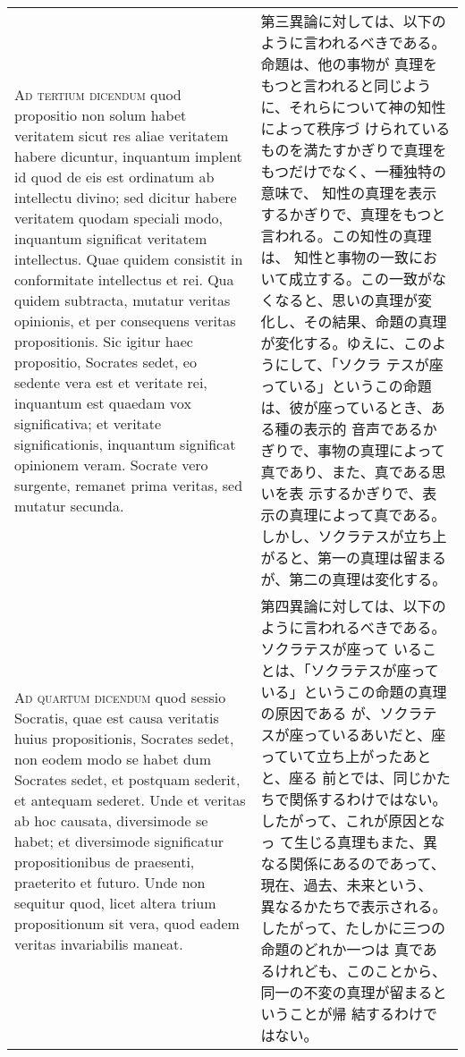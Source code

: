\documentclass[10pt]{jsarticle} %
\begin{document}
\begin{longtable}{p{21em}p{21em}}
\\


{\scshape Ad tertium dicendum} quod propositio non solum habet
veritatem sicut res aliae veritatem habere dicuntur, inquantum implent
id quod de eis est ordinatum ab intellectu divino; sed dicitur habere
veritatem quodam speciali modo, inquantum significat veritatem
intellectus. Quae quidem consistit in conformitate intellectus et
rei. Qua quidem subtracta, mutatur veritas opinionis, et per
consequens veritas propositionis. Sic igitur haec propositio, Socrates
sedet, eo sedente vera est et veritate rei, inquantum est quaedam vox
significativa; et veritate significationis, inquantum significat
opinionem veram. Socrate vero surgente, remanet prima veritas, sed
mutatur secunda.

&

第三異論に対しては、以下のように言われるべきである。命題は、他の事物が
真理をもつと言われると同じように、それらについて神の知性によって秩序づ
けられているものを満たすかぎりで真理をもつだけでなく、一種独特の意味で、
知性の真理を表示するかぎりで、真理をもつと言われる。この知性の真理は、
知性と事物の一致において成立する。この一致がなくなると、思いの真理が変
化し、その結果、命題の真理が変化する。ゆえに、このようにして、「ソクラ
テスが座っている」というこの命題は、彼が座っているとき、ある種の表示的
音声であるかぎりで、事物の真理によって真であり、また、真である思いを表
示するかぎりで、表示の真理によって真である。しかし、ソクラテスが立ち上
がると、第一の真理は留まるが、第二の真理は変化する。

\\


{\scshape Ad quartum dicendum} quod sessio Socratis, quae est causa
veritatis huius propositionis, Socrates sedet, non eodem modo se habet
dum Socrates sedet, et postquam sederit, et antequam sederet. Unde et
veritas ab hoc causata, diversimode se habet; et diversimode
significatur propositionibus de praesenti, praeterito et futuro. Unde
non sequitur quod, licet altera trium propositionum sit vera, quod
eadem veritas invariabilis maneat.

&

第四異論に対しては、以下のように言われるべきである。ソクラテスが座って
いることは、「ソクラテスが座っている」というこの命題の真理の原因である
が、ソクラテスが座っているあいだと、座っていて立ち上がったあとと、座る
前とでは、同じかたちで関係するわけではない。したがって、これが原因となっ
て生じる真理もまた、異なる関係にあるのであって、現在、過去、未来という、
異なるかたちで表示される。したがって、たしかに三つの命題のどれか一つは
真であるけれども、このことから、同一の不変の真理が留まるということが帰
結するわけではない。
\end{longtable}
\end{document}

